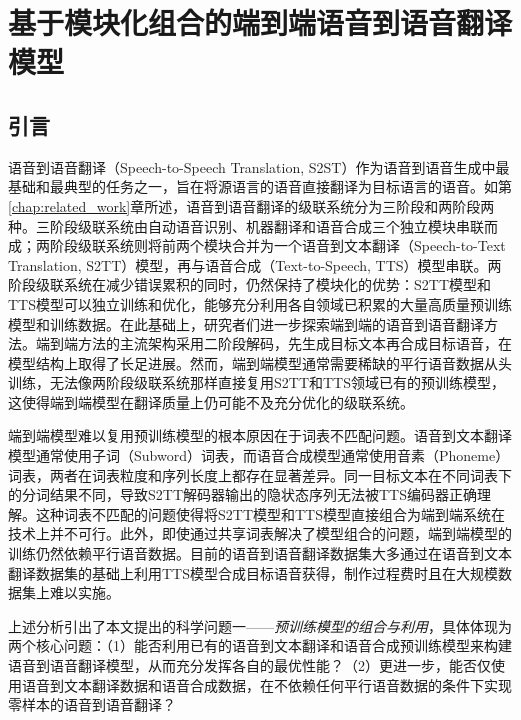\chapter{基于模块化组合的端到端语音到语音翻译模型}\label{chap:comspeech}

\section{引言}

语音到语音翻译（Speech-to-Speech Translation, S2ST）作为语音到语音生成中最基础和最典型的任务之一，旨在将源语言的语音直接翻译为目标语言的语音。如第\ref{chap:related_work}章所述，语音到语音翻译的级联系统分为三阶段和两阶段两种。三阶段级联系统由自动语音识别、机器翻译和语音合成三个独立模块串联而成；两阶段级联系统则将前两个模块合并为一个语音到文本翻译（Speech-to-Text Translation, S2TT）模型，再与语音合成（Text-to-Speech, TTS）模型串联。两阶段级联系统在减少错误累积的同时，仍然保持了模块化的优势：S2TT模型和TTS模型可以独立训练和优化，能够充分利用各自领域已积累的大量高质量预训练模型和训练数据。在此基础上，研究者们进一步探索端到端的语音到语音翻译方法。端到端方法的主流架构采用二阶段解码，先生成目标文本再合成目标语音，在模型结构上取得了长足进展。然而，端到端模型通常需要稀缺的平行语音数据从头训练，无法像两阶段级联系统那样直接复用S2TT和TTS领域已有的预训练模型，这使得端到端模型在翻译质量上仍可能不及充分优化的级联系统。

端到端模型难以复用预训练模型的根本原因在于词表不匹配问题。语音到文本翻译模型通常使用子词（Subword）词表，而语音合成模型通常使用音素（Phoneme）词表，两者在词表粒度和序列长度上都存在显著差异。同一目标文本在不同词表下的分词结果不同，导致S2TT解码器输出的隐状态序列无法被TTS编码器正确理解。这种词表不匹配的问题使得将S2TT模型和TTS模型直接组合为端到端系统在技术上并不可行。此外，即使通过共享词表解决了模型组合的问题，端到端模型的训练仍然依赖平行语音数据。目前的语音到语音翻译数据集大多通过在语音到文本翻译数据集的基础上利用TTS模型合成目标语音获得，制作过程费时且在大规模数据集上难以实施。

上述分析引出了本文提出的科学问题一——\textit{预训练模型的组合与利用}，具体体现为两个核心问题：（1）能否利用已有的语音到文本翻译和语音合成预训练模型来构建语音到语音翻译模型，从而充分发挥各自的最优性能？（2）更进一步，能否仅使用语音到文本翻译数据和语音合成数据，在不依赖任何平行语音数据的条件下实现零样本的语音到语音翻译？

